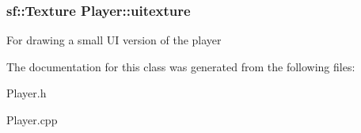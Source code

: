 \subsubsection[{\texorpdfstring{uitexture}{uitexture}}]{\setlength{\rightskip}{0pt plus 5cm}sf\+::\+Texture Player\+::uitexture\hspace{0.3cm}{\ttfamily [private]}}\hypertarget{class_player_a5958cdcfe9ad932e79fa1ec92c99fcfc}{}\label{class_player_a5958cdcfe9ad932e79fa1ec92c99fcfc}
For drawing a small UI version of the player 

The documentation for this class was generated from the following files\+:\begin{DoxyCompactItemize}
\item 
Player.\+h\item 
Player.\+cpp\end{DoxyCompactItemize}
